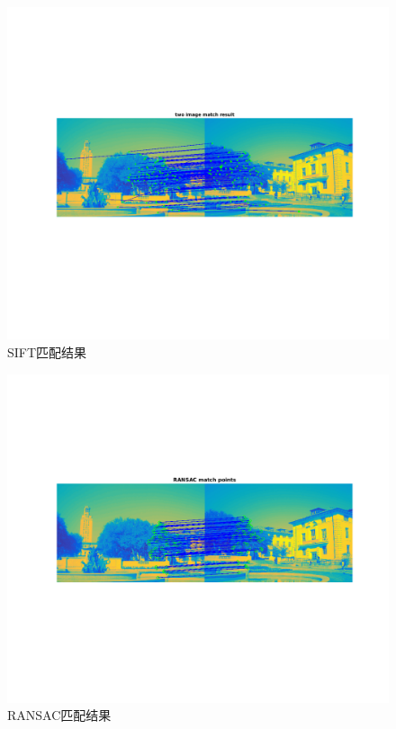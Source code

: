 \documentclass[a4paper, UTF8]{ctexrep}
\begin{document}
		\begin{figure}[htbp!]
			\centering
			\includegraphics[width = \textwidth]{hw2_fig3.png}
			\caption{SIFT匹配结果}
			\label{fig:figure1}
		\end{figure}
		\clearpage
		\begin{figure}[htbp!]
			\centering
			\includegraphics[width = \textwidth]{hw2_fig4.png}
			\caption{RANSAC匹配结果}
			\label{fig:figure1}
		\end{figure}
\end{document}
